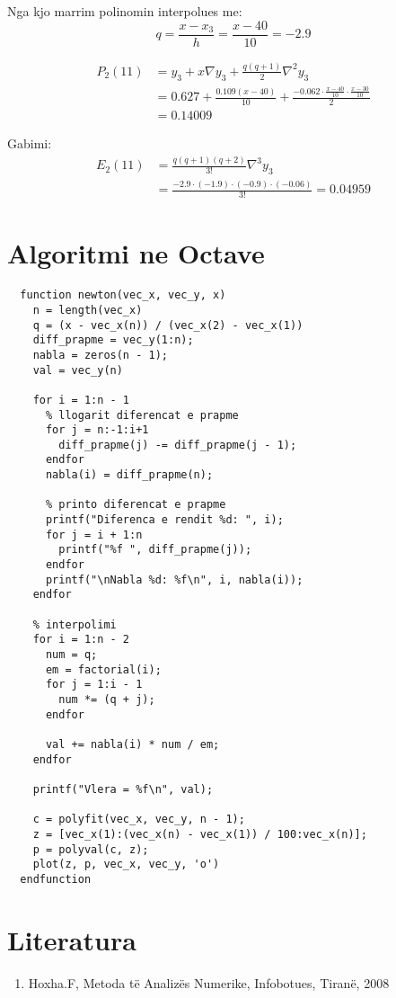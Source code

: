 \documentclass[12pt, margin=1in, a4paper]{article}
\begin{document}
  Nga kjo marrim polinomin interpolues me:
  \begin{equation}
    q = \frac{x - x_3}{h} = \frac{x - 40}{10} = -2.9
  \end{equation}

  \begin{equation}
  \begin{aligned}
    P_2(11) &= y_3 + x\nabla y_3 + \frac{q(q + 1)}{2}\nabla^2y_3 \\
    &= 0.627 + \frac{0.109(x - 40)}{10} + \frac{-0.062 \cdot \frac{x - 40}{10} \cdot \frac{x - 30}{10}}{2} \\
    &= 0.14009
  \end{aligned}
  \end{equation}

  Gabimi:
  \begin{equation}
  \begin{aligned}
    E_2(11) &= \frac{q(q + 1)(q + 2)}{3!}\nabla^3y_3 \\
    &= \frac{-2.9 \cdot (-1.9) \cdot (-0.9) \cdot (-0.06)}{3!} = 0.04959
  \end{aligned}
  \end{equation}

  \newpage

\section{Algoritmi ne Octave}
  \begin{lstlisting}
  function newton(vec_x, vec_y, x)
    n = length(vec_x)
    q = (x - vec_x(n)) / (vec_x(2) - vec_x(1))
    diff_prapme = vec_y(1:n);
    nabla = zeros(n - 1);
    val = vec_y(n)
  
    for i = 1:n - 1
      % llogarit diferencat e prapme
      for j = n:-1:i+1
        diff_prapme(j) -= diff_prapme(j - 1);
      endfor
      nabla(i) = diff_prapme(n);
  
      % printo diferencat e prapme
      printf("Diferenca e rendit %d: ", i);
      for j = i + 1:n
        printf("%f ", diff_prapme(j));
      endfor
      printf("\nNabla %d: %f\n", i, nabla(i));
    endfor
  
    % interpolimi
    for i = 1:n - 2
      num = q;
      em = factorial(i);
      for j = 1:i - 1
        num *= (q + j);
      endfor

      val += nabla(i) * num / em;
    endfor
  
    printf("Vlera = %f\n", val);
  
    c = polyfit(vec_x, vec_y, n - 1);
    z = [vec_x(1):(vec_x(n) - vec_x(1)) / 100:vec_x(n)];
    p = polyval(c, z);
    plot(z, p, vec_x, vec_y, 'o')
  endfunction
  \end{lstlisting}
  \newpage

\section{Literatura}
\begin{enumerate}
  \item Hoxha.F, Metoda të Analizës Numerike, Infobotues, Tiranë, 2008
\end{enumerate}
\end{document}
